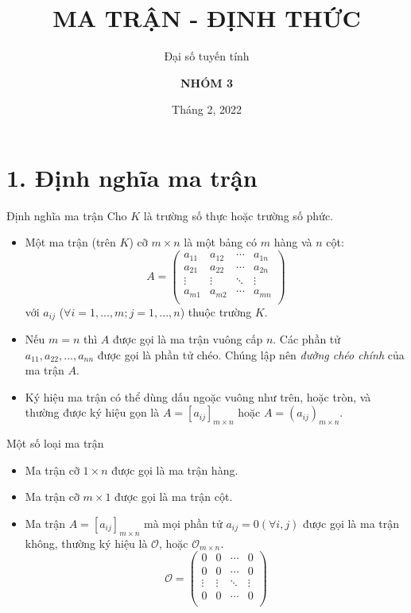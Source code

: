 \documentclass[pdf,10pt]{beamer}
\title{\textbf{MA TRẬN - ĐỊNH THỨC}}
\subtitle{Đại số tuyến tính}
\author{\textbf{NHÓM 3}}
\institute{\textcolor{red}{\textbf{Đại học Bách Khoa Hà Nội}}}
\date{Tháng 2, 2022}
\begin{document}

\begin{frame}
	\titlepage
\end{frame}

\section{1. Định nghĩa ma trận}
\begin{frame}{Định nghĩa ma trận}
	Cho $K$ là trường số thực hoặc trường số phức.
	\begin{itemize}
		\item Một ma trận (trên $K$) cỡ $m\times n$ là một bảng có $m$ hàng và $n$ cột:
		    \begin{displaymath}
			A =
			\left (
			\begin{array}{cccc}
				a_{11} & a_{12} & \cdots & a_{1n} \\
				a_{21} & a_{22} & \cdots & a_{2n} \\
				\vdots & \vdots & \ddots &\vdots \\
				a_{m1} & a_{m2} & \cdots & a_{mn} \\
			\end{array}
			\right )
			\end{displaymath}
		với $a_{ij}$ ($\forall i=1,...,m;j=1,...,n$) thuộc trường $K$.
		\item Nếu $m=n$ thì $A$ được gọi là ma trận vuông cấp $n$. Các phần tử $a_{11},a_{22},...,a_{nn}$ được gọi là phần tử chéo. Chúng lập nên \emph{đường chéo chính} của ma trận $A$.
		\item Ký hiệu ma trận có thể dùng dấu ngoặc vuông như trên, hoặc tròn, và thường được ký hiệu gọn là $A= [a_{ij}]_{m\times n}$ hoặc $A= (a_{ij})_{m\times n}$.
	\end{itemize}
\end{frame}

\begin{frame}{Một số loại ma trận}
	\begin{itemize}
		\item Ma trận cỡ $1\times n$ được gọi là ma trận hàng.
		\item Ma trận cỡ $m\times 1$ được gọi là ma trận cột.
		\item Ma trận $A= [a_{ij}]_{m\times n}$ mà mọi phần tử $a_{ij}=0 (\forall i,j)$ được gọi là ma trận không, thường ký hiệu là $\mathcal{O}$, hoặc $\mathcal{O}_{m\times n}$.
		\begin{displaymath}
			\mathcal{O} = 
			\left (
			\begin{array}{cccc}
				0  & 0 & \cdots & 0  \\
				0  & 0 & \cdots & 0  \\
				\vdots & \vdots & \ddots &\vdots \\
				0  & 0 & \cdots & 0  \\
			\end{array}
			\right )
		\end{displaymath}
	\end{itemize}
\end{frame}
\end{document}
